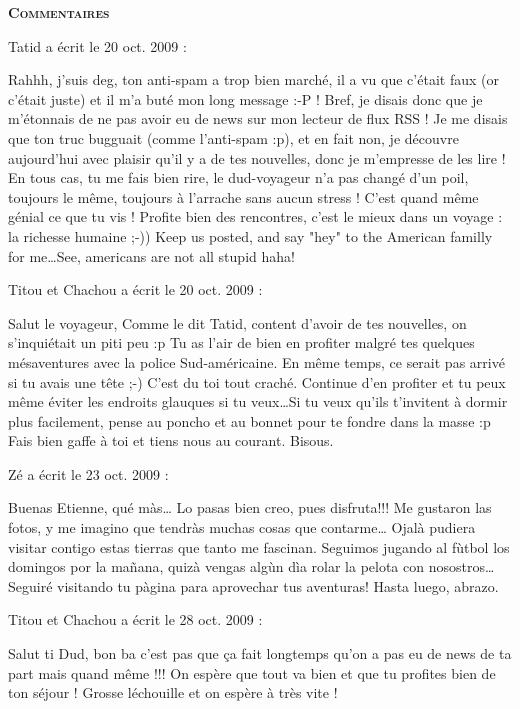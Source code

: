 \bigskip
\textbf{\textsc{Commentaires}}

\medskip
Tatid a écrit le 20 oct. 2009 :
\begin{displayquote}
Rahhh, j'suis deg, ton anti-spam a trop bien marché, il a vu que c'était faux (or c'était juste) et il m'a buté mon long message :-P !
Bref, je disais donc que je m'étonnais de ne pas avoir eu de news sur mon lecteur de flux RSS ! Je me disais que ton truc bugguait (comme l'anti-spam :p), et en fait non, je découvre aujourd'hui avec plaisir qu'il y a de tes nouvelles, donc je m'empresse de les lire !
En tous cas, tu me fais bien rire, le dud-voyageur n'a pas changé d'un poil, toujours le même, toujours à l'arrache sans aucun stress ! C'est quand même génial ce que tu vis ! Profite bien des rencontres, c'est le mieux dans un voyage : la richesse humaine ;-))
Keep us posted, and say "hey" to the American familly for me\dots See, americans are not all stupid haha!
\end{displayquote}

\medskip
Titou et Chachou a écrit le 20 oct. 2009 :
\begin{displayquote}
Salut le voyageur,
Comme le dit Tatid, content d'avoir de tes nouvelles, on s'inquiétait un piti peu :p
Tu as l'air de bien en profiter malgré tes quelques mésaventures avec la police Sud-américaine. En même temps, ce serait pas arrivé si tu avais une tête ;-) C'est du toi tout craché.
Continue d'en profiter et tu peux même éviter les endroits glauques si tu veux\dots Si tu veux qu'ils t'invitent à dormir plus facilement, pense au poncho et au bonnet pour te fondre dans la masse :p
Fais bien gaffe à toi et tiens nous au courant.
Bisous.
\end{displayquote}

\medskip
Zé a écrit le 23 oct. 2009 :
\begin{displayquote}
Buenas Etienne, qué màs\dots
Lo pasas bien creo, pues disfruta!!!
Me gustaron las fotos, y me imagino que tendràs muchas cosas que contarme\dots
Ojalà pudiera visitar contigo estas tierras que tanto me fascinan.
Seguimos jugando al fùtbol los domingos por la mañana, quizà vengas algùn dìa rolar la pelota con nosostros\dots
Seguiré visitando tu pàgina para aprovechar tus aventuras!
Hasta luego, abrazo.
\end{displayquote}

\medskip
Titou et Chachou a écrit le 28 oct. 2009 :
\begin{displayquote}
Salut ti Dud,
bon ba c'est pas que ça fait longtemps qu'on a pas eu de news de ta part mais quand même !!! On espère que tout va bien et que tu profites bien de ton séjour !
Grosse léchouille et on espère à très vite !
\end{displayquote}

